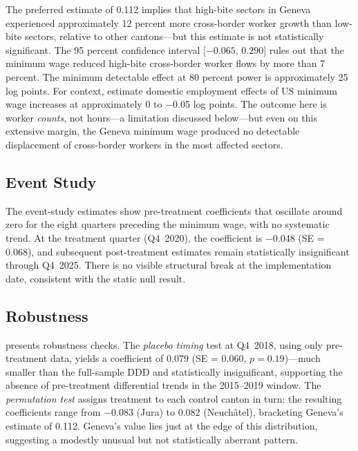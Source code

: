 \documentclass[12pt]{article}
\begin{document}


The preferred estimate of 0.112 implies that high-bite sectors in Geneva experienced approximately 12 percent more cross-border worker growth than low-bite sectors, relative to other cantons---but this estimate is not statistically significant. The 95 percent confidence interval [$-0.065$, $0.290$] rules out that the minimum wage reduced high-bite cross-border worker flows by more than 7 percent. The minimum detectable effect at 80 percent power is approximately 25 log points. For context, \citet{cengiz2019} estimate domestic employment effects of US minimum wage increases at approximately 0 to $-$0.05 log points. The outcome here is worker \textit{counts}, not hours---a limitation discussed below---but even on this extensive margin, the Geneva minimum wage produced no detectable displacement of cross-border workers in the most affected sectors.

\subsection{Event Study}

The event-study estimates show pre-treatment coefficients that oscillate around zero for the eight quarters preceding the minimum wage, with no systematic trend. At the treatment quarter (Q4~2020), the coefficient is $-0.048$ (SE = 0.068), and subsequent post-treatment estimates remain statistically insignificant through Q4~2025. There is no visible structural break at the implementation date, consistent with the static null result.

\subsection{Robustness}

 presents robustness checks. The \textit{placebo timing} test at Q4~2018, using only pre-treatment data, yields a coefficient of 0.079 (SE = 0.060, $p = 0.19$)---much smaller than the full-sample DDD and statistically insignificant, supporting the absence of pre-treatment differential trends in the 2015--2019 window. The \textit{permutation test} assigns treatment to each control canton in turn: the resulting coefficients range from $-0.083$ (Jura) to 0.082 (Neuch\^atel), bracketing Geneva's estimate of 0.112. Geneva's value lies just at the edge of this distribution, suggesting a modestly unusual but not statistically aberrant pattern.
\end{document}
